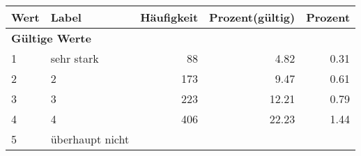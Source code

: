      \begin{longtable}{lXrrr}
     \toprule
     \textbf{Wert} & \textbf{Label} & \textbf{Häufigkeit} & \textbf{Prozent(gültig)} & \textbf{Prozent} \\
     \endhead
     \midrule
     \multicolumn{5}{l}{\textbf{Gültige Werte}}\\

     1 &
     \multicolumn{1}{X}{ sehr stark   } &


       \num{88} &
       \num[round-mode=places,round-precision=2]{4,82} &
         \num[round-mode=places,round-precision=2]{0,31} \\

     2 &
     \multicolumn{1}{X}{ 2   } &


       \num{173} &
       \num[round-mode=places,round-precision=2]{9,47} &
         \num[round-mode=places,round-precision=2]{0,61} \\

     3 &
     \multicolumn{1}{X}{ 3   } &


       \num{223} &
       \num[round-mode=places,round-precision=2]{12,21} &
         \num[round-mode=places,round-precision=2]{0,79} \\

     4 &
     \multicolumn{1}{X}{ 4   } &


       \num{406} &
       \num[round-mode=places,round-precision=2]{22,23} &
         \num[round-mode=places,round-precision=2]{1,44} \\

     5 &
     \multicolumn{1}{X}{ überhaupt nicht   } &



\end{longtable}
